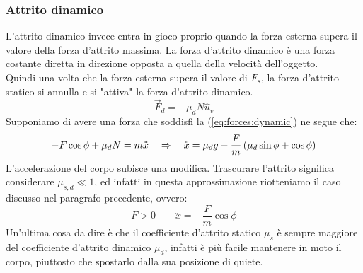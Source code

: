 \subsubsection{Attrito dinamico}
L'attrito dinamico invece entra in gioco proprio quando la forza esterna
supera il valore della forza d'attrito massima. La forza d'attrito dinamico
è una forza costante diretta in direzione opposta a quella della velocità
dell'oggetto.\\
Quindi una volta che la forza esterna supera il valore di $F_s$,
la forza d'attrito statico si annulla e si "attiva" la forza d'attrito dinamico.
\begin{equation}
    \vec F_d = -\mu_dN\hat u_v
\label{eq:forces:dynamic}
\end{equation}
Supponiamo di avere una forza che soddisfi la (\ref{eq:forces:dynamic})
ne segue che:
\begin{equation}
    -F\cos\phi + \mu_dN = m\ddot x \quad\Rightarrow\quad \ddot x =
    \mu_dg-\frac Fm\left(\mu_d\sin\phi + \cos\phi\right)
\end{equation}
L'accelerazione del corpo subisce una modifica. Trascurare l'attrito
significa considerare $\mu_{s,d}\ll 1$, ed infatti in questa approssimazione
riotteniamo il caso discusso nel paragrafo precedente, ovvero:
\begin{equation}
    F>0\quad\quad \ddot x = -\frac Fm\cos\phi
\end{equation}
Un'ultima cosa da dire è che il coefficiente d'attrito statico $\mu_s$ è
sempre maggiore del coefficiente d'attrito dinamico $\mu_d$, infatti è più
facile mantenere in moto il corpo, piuttosto che spostarlo dalla sua
posizione di quiete.
